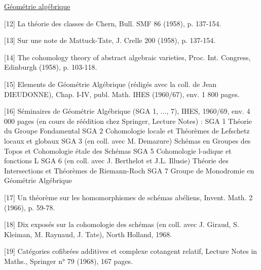 
\uline{Géométrie algébrique}

[12] La théorie des classes de Chern, Bull. SMF 86
(1958), p. 137-154.

[13] Sur une note de Mattuck-Tate, J. Crelle 200
(1958), p. 137-154.

[14] The cohomology theory of abstract algebraic
varieties, Proc. Int. Congress, Edinburgh
(1958), p. 103-118.

[15] Elements de Géométrie Algébrique (rédigés avec
la coll. de Jean DIEUDONNE), Chap. I-IV, publ.
Math. IHES (1960/67), env. 1 800 pages.

[16] Séminaires de Géométrie Algébrique (SGA 1, ...,
7), IHES, 1960/69, env. 4 000 pages (en cours
de réédition chez Springer, Lecture Notes) :
SGA 1 Théorie du Groupe Fondamental
SGA 2 Cohomologie locale et Théorèmes de Lefschetz
locaux et globaux
SGA 3 (en coll. avec M. Demazure) Schémas en Groupes
des Topos et Cohomologie étale des Schémas
SGA 5 Cohomologie l-adique et fonctions L
SGA 6 (en coll. avec J. Berthelot et J.L. Illusie)
Théorie des Intersections et Théorèmes de
Riemann-Roch
SGA 7 Groupe de Monodromie en Géométrie Algébrique

[17] Un théorème sur les homomorphismes de schémas
abéliens, Invent. Math. 2 (1966), p. 59-78.

[18] Dix exposés sur la cohomologie des schémas
(en coll. avec J. Giraud, S. Kleiman,
M. Raynaud, J. Tate), North Holland, 1968.

[19] Catégories cofibrées additives et complexe
cotangent relatif, Lecture Notes in Maths.,
Springer n° 79 (1968), 167 pages.


